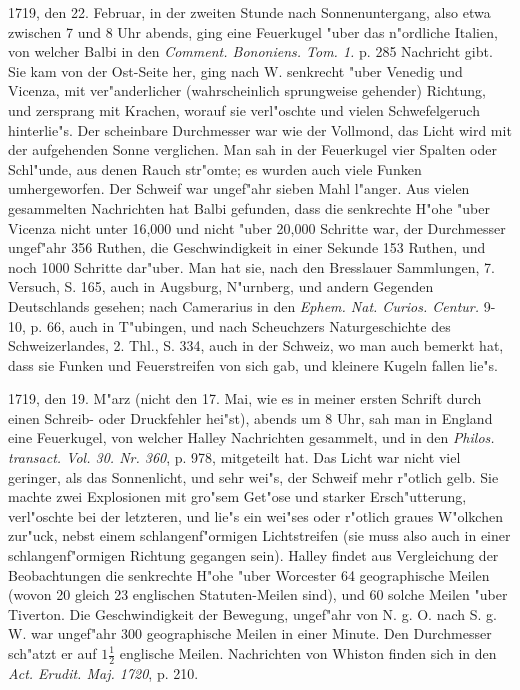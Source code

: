 \documentclass[a4paper, 11pt, oneside, polutonikogreek, german]{article}
\begin{document}
1719, den 22. Februar, in der zweiten Stunde nach Sonnenuntergang, also etwa zwischen 7 und 8 Uhr abends, ging eine Feuerkugel "uber das n"ordliche Italien, von welcher Balbi in den \emph{Comment. Bononiens. Tom. 1.} p. 285 Nachricht gibt. Sie kam von der Ost-Seite her, ging nach W. senkrecht "uber Venedig und Vicenza, mit ver"anderlicher (wahrscheinlich sprungweise gehender) Richtung, und zersprang mit Krachen, worauf sie verl"oschte und vielen Schwefelgeruch hinterlie"s. Der scheinbare Durchmesser war wie der Vollmond, das Licht wird mit der aufgehenden Sonne verglichen. Man sah in der Feuerkugel vier Spalten oder Schl"unde, aus denen Rauch str"omte; es wurden auch viele Funken umhergeworfen. Der Schweif war ungef"ahr sieben Mahl l"anger. Aus vielen gesammelten Nachrichten hat Balbi gefunden, dass die senkrechte H"ohe "uber Vicenza nicht unter 16,000 und nicht "uber 20,000 Schritte war, der Durchmesser ungef"ahr 356 Ruthen, die Geschwindigkeit in einer Sekunde 153 Ruthen, und noch 1000 Schritte dar"uber. Man hat sie, nach den Bresslauer Sammlungen, 7. Versuch, S. 165, auch in Augsburg, N"urnberg, und andern Gegenden Deutschlands gesehen; nach Camerarius in den \emph{Ephem. Nat. Curios. Centur.} 9-10, p. 66, auch in T"ubingen, und nach Scheuchzers Naturgeschichte des Schweizerlandes, 2. Thl., S. 334, auch in der Schweiz, wo man auch bemerkt hat, dass sie Funken und Feuerstreifen von sich gab, und kleinere Kugeln fallen lie"s.

1719, den 19. M"arz (nicht den 17. Mai, wie es in meiner ersten Schrift durch einen Schreib- oder Druckfehler hei"st), abends um 8 Uhr, sah man in England eine Feuerkugel, von welcher Halley Nachrichten gesammelt, und in den \emph{Philos. transact. Vol. 30. Nr. 360}, p. 978, mitgeteilt hat. Das Licht war nicht viel geringer, als das Sonnenlicht, und sehr wei"s, der Schweif mehr r"otlich gelb. Sie machte zwei Explosionen mit gro"sem Get"ose und starker Ersch"utterung, verl"oschte bei der letzteren, und lie"s ein wei"ses oder r"otlich graues W"olkchen zur"uck, nebst einem schlangenf"ormigen Lichtstreifen (sie muss also auch in einer schlangenf"ormigen Richtung gegangen sein). Halley findet aus Vergleichung der Beobachtungen die senkrechte H"ohe "uber Worcester 64 geographische Meilen (wovon 20 gleich 23 englischen Statuten-Meilen sind), und 60 solche Meilen "uber Tiverton. Die Geschwindigkeit der Bewegung, ungef"ahr von N. g. O. nach S. g. W. war ungef"ahr 300 geographische Meilen in einer Minute. Den Durchmesser sch"atzt er auf $\mathfrak{1\frac{1}{2}}$ englische Meilen. Nachrichten von Whiston finden sich in den \emph{Act. Erudit. Maj. 1720}, p. 210.
\end{document}
